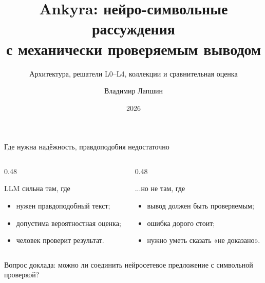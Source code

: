 \documentclass[aspectratio=169,11pt]{beamer}
\title{Ankyra: нейро-символьные рассуждения\\с механически проверяемым выводом}
\subtitle{Архитектура, решатели L0--L4, коллекции и сравнительная оценка}
\author{Владимир Лапшин}
\date{2026}
\begin{document}
\begin{frame}[plain,shrink=5]
  \titlepage
\end{frame}

\begin{frame}[shrink=2]{Где нужна надёжность, правдоподобия недостаточно}
  \small
  \begin{columns}[T,onlytextwidth]
    \begin{column}{0.48\textwidth}
      \begin{block}{LLM сильна там, где}
        \begin{itemize}
          \item нужен правдоподобный текст;
          \item допустима вероятностная оценка;
          \item человек проверит результат.
        \end{itemize}
      \end{block}
    \end{column}
    \begin{column}{0.48\textwidth}
      \begin{block}{...но не там, где}
        \begin{itemize}
          \item вывод должен быть проверяемым;
          \item ошибка дорого стоит;
          \item нужно уметь сказать «не доказано».
        \end{itemize}
      \end{block}
    \end{column}
  \end{columns}

  \vspace{3mm}
  \begin{center}
    \large
    Вопрос доклада: можно ли соединить нейросетевое предложение
    с символьной проверкой?
  \end{center}
\end{frame}
\end{document}
